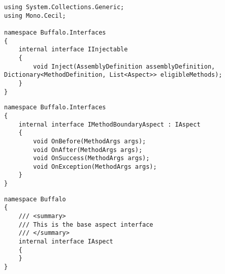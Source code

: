 \begin{lstlisting}[caption={../buffalo/Interfaces/IInjectable.cs}, label=../buffalo/Interfaces/IInjectable.cs, frame=tb, basicstyle=\scriptsize]﻿using System.Collections.Generic;
using Mono.Cecil;

namespace Buffalo.Interfaces
{
    internal interface IInjectable
    {
        void Inject(AssemblyDefinition assemblyDefinition, Dictionary<MethodDefinition, List<Aspect>> eligibleMethods);
    }
}
\end{lstlisting}

\begin{lstlisting}[caption={../buffalo/Interfaces/IMethodBoundaryAspect.cs}, label=../buffalo/Interfaces/IMethodBoundaryAspect.cs, frame=tb, basicstyle=\scriptsize]﻿namespace Buffalo.Interfaces
{
    internal interface IMethodBoundaryAspect : IAspect
    {
        void OnBefore(MethodArgs args);
        void OnAfter(MethodArgs args);
        void OnSuccess(MethodArgs args);
        void OnException(MethodArgs args);
    }
}
\end{lstlisting}

\begin{lstlisting}[caption={../buffalo/Interfaces/IAspect.cs}, label=../buffalo/Interfaces/IAspect.cs, frame=tb, basicstyle=\scriptsize]﻿namespace Buffalo
{
    /// <summary>
    /// This is the base aspect interface
    /// </summary>
    internal interface IAspect
    {
    }
}
\end{lstlisting}

